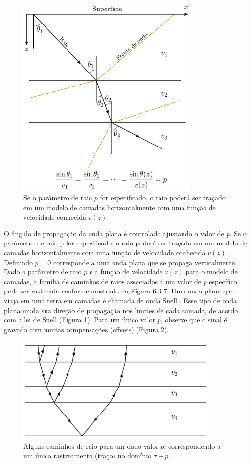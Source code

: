 \begin{figure}[H]
\centering
\includegraphics[width=9cm]{figuras/cap2/radon6.pdf}
\caption{Se o parâmetro de raio $p$ for especificado, o raio poderá ser traçado em um modelo de camadas horizontalmente com uma função de velocidade conhecida $v(z)$.}
\label{fig:radon6}
\end{figure}

O ângulo de propagação da onda plana é controlado ajustando o valor de $p$. Se o parâmetro de raio p for especificado, o raio poderá ser traçado em um modelo de camadas horizontalmente com uma função de velocidade conhecida $v(z)$. Definindo $p = 0$ corresponde a uma onda plana que se propaga verticalmente.
Dado o parâmetro de raio $p$ e a função de velocidade $v(z)$ para o modelo de camadas, a família de caminhos de raios associados a um valor de $p$ específico pode ser rastreada conforme mostrado na Figura 6.3-7. Uma onda plana que viaja em uma terra em camadas é chamada de onda Snell \citep{Claerbout(1978)}. Esse tipo de onda plana muda sua direção de propagação nos limites de cada camada, de acordo com a lei de Snell (Figura \ref{fig:radon6}). Para um único valor $p$, observe que o sinal é gravado com muitas compensações (offsets) (Figura \ref{fig:radon7}).

\begin{figure}[H]
\centering
\includegraphics[width=10cm]{figuras/cap2/radon7.pdf}
\caption{Alguns caminhos de raio para um dado valor $p$, correspondendo a um único rastreamento (traço) no domínio $\tau - p$.}
\label{fig:radon7}
\end{figure}



